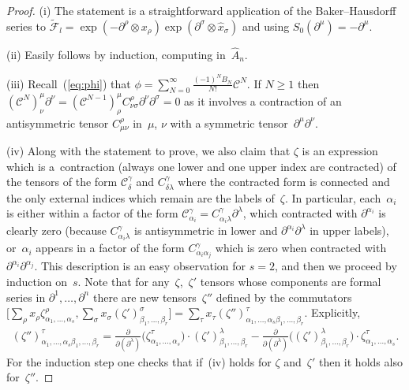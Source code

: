 \documentclass[pdftex]{sigma}
\def\CC{\mathcal{C}}
\def\hx{\hat{x}}
\numberwithin{equation}{section}
\begin{document}
\begin{proof}(i) The statement is a straightforward application of the Baker--Hausdorff series to $\tilde{\mathcal{F}}_l=\exp(-\partial^\rho\otimes x_\rho)\exp(\partial^\sigma\otimes\hx_\sigma)$ and using $S_0(\partial^\mu)=-\partial^\mu$.

(ii) Easily follows by induction, computing in~$\hat{A}_n$.

(iii) Recall~(\ref{eq:phi}) that $\phi = \sum\limits_{N=0}^\infty \frac{(-1)^N B_N}{N!} \CC^N$. If $N\geq 1$ then $(\mathcal{C}^N)^\mu_\nu\partial^\nu = (\mathcal{C}^{N-1})^\mu_\rho C^\rho_{\nu\sigma}\partial^\nu\partial^\sigma = 0$ as it involves a contraction of an antisymmetric tensor $C^\rho_{\mu\nu}$ in~$\mu$, $\nu$ with a symmetric tensor~$\partial^\mu\partial^\nu$.

(iv) Along with the statement to prove, we also claim that $\zeta$ is an expression which is a~contraction (always one lower and one upper index are contracted) of the tensors of the form $\mathcal{C}^\gamma_\delta$ and $C^\gamma_{\delta\lambda}$ where the contracted form is connected and the only external indices which remain are the labels of~$\zeta$. In particular, each~$\alpha_i$ is either within a factor of the form $\mathcal{C}^\gamma_{\alpha_i} = C^\gamma_{\alpha_i\lambda}\partial^\lambda$, which contracted with $\partial^{\alpha_i}$ is clearly zero (because $C^\gamma_{\alpha_i\lambda}$ is antisymmetric in lower and $\partial^{\alpha_i}\partial^\lambda$ in upper labels), or~$\alpha_i$ appears in a factor of the form $C^\gamma_{\alpha_i\alpha_j}$ which is zero when contracted with~$\partial^{\alpha_i}\partial^{\alpha_j}$. This description is an easy observation for $s = 2$, and then we proceed by induction on~$s$. Note that for any~$\zeta$,~$\zeta'$ tensors whose components are formal series in $\partial^1,\dots,\partial^n$ there are new tensors~$\zeta''$ defined by the commutators $\big[\sum_\rho x_\rho\zeta^\rho_{\alpha_1,\dots,\alpha_s},\sum_\sigma x_\sigma(\zeta')^\sigma_{\beta_1,\dots,\beta_r}\big] = \sum_\tau x_\tau(\zeta'')^\tau_{\alpha_1,\dots,\alpha_s\beta_1,\dots,\beta_r}$. Explicitly,{\samepage
\begin{gather*}
(\zeta'')^\tau_{\alpha_1,\dots,\alpha_s\beta_1,\dots,\beta_r} =
\frac{\partial}{\partial(\partial^\lambda)}\big(\zeta^\tau_{\alpha_1,\dots,\alpha_s}\big) \cdot(\zeta')^\lambda_{\beta_1,\dots,\beta_r}-\frac{\partial}{\partial(\partial^\lambda)}\big((\zeta')^\lambda_{\beta_1,\dots,\beta_r}\big) \cdot\zeta^\tau_{\alpha_1,\dots,\alpha_s}.
\end{gather*}
For the induction step one checks that if~(iv) holds for $\zeta$ and~$\zeta'$ then it holds also for~$\zeta''$.}


\end{proof}
\end{document}
